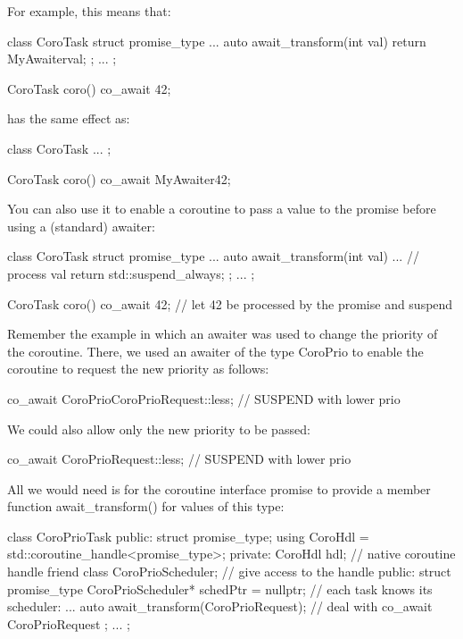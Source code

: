 For example, this means that:

\begin{cpp}
class CoroTask {
	struct promise_type {
		...
		auto await_transform(int val) {
			return MyAwaiter{val};
		}
	};
	...
};

CoroTask coro()
{
	co_await 42;
}
\end{cpp}

has the same effect as:

\begin{cpp}
class CoroTask {
	...
};

CoroTask coro()
{
	co_await MyAwaiter{42};
}
\end{cpp}

You can also use it to enable a coroutine to pass a value to the promise before using a (standard) awaiter:

\begin{cpp}
class CoroTask {
	struct promise_type {
		...
		auto await_transform(int val) {
			... // process val
			return std::suspend_always{};
		}
	};
	...
};

CoroTask coro()
{
	co_await 42; // let 42 be processed by the promise and suspend
}
\end{cpp}


Remember the example in which an awaiter was used to change the priority of the coroutine. There, we used an awaiter of the type CoroPrio to enable the coroutine to request the new priority as follows:

\begin{cpp}
co_await CoroPrio{CoroPrioRequest::less}; // SUSPEND with lower prio
\end{cpp}

We could also allow only the new priority to be passed:

\begin{cpp}
co_await CoroPrioRequest::less; // SUSPEND with lower prio
\end{cpp}

All we would need is for the coroutine interface promise to provide a member function await\_transform() for values of this type:

\begin{cpp}
class CoroPrioTask {
public:
	struct promise_type;
	using CoroHdl = std::coroutine_handle<promise_type>;
private:
	CoroHdl hdl; // native coroutine handle
	friend class CoroPrioScheduler; // give access to the handle
public:
	struct promise_type {
		CoroPrioScheduler* schedPtr = nullptr; // each task knows its scheduler:
		...
		auto await_transform(CoroPrioRequest); // deal with co_await CoroPrioRequest
	};
	...
};
\end{cpp}


